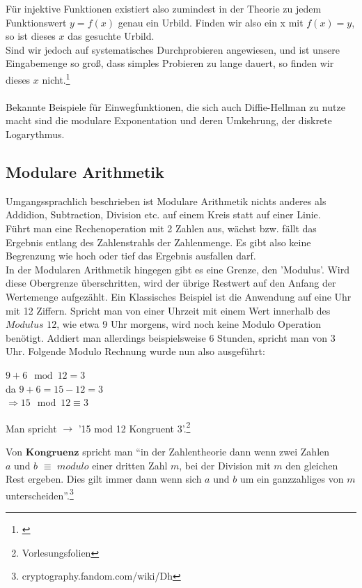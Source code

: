 \documentclass[a4paper,12pt]{scrartcl}
\begin{document}
Für injektive Funktionen existiert also zumindest in der Theorie zu jedem
Funktionswert $y = f(x)$ genau ein Urbild. Finden wir also ein x mit $f(x) = y$, so ist
dieses $x$ das gesuchte Urbild.\\
Sind wir jedoch auf systematisches Durchprobieren angewiesen, und ist
unsere Eingabemenge so groß, dass simples Probieren zu lange dauert, so
finden wir dieses $x$ nicht.\footnote{\cite{10.1007/BFb0054851}}\\
\\
Bekannte Beispiele für Einwegfunktionen, die sich auch Diffie-Hellman zu nutze macht sind die modulare Exponentation und deren Umkehrung, der diskrete Logarythmus.
\newpage
\subsection{Modulare Arithmetik}
Umgangssprachlich beschrieben ist Modulare Arithmetik nichts anderes als Addidion, Subtraction, Division etc. auf einem Kreis statt auf einer Linie. \\
Führt man eine Rechenoperation mit 2 Zahlen aus, wächst bzw. fällt das Ergebnis entlang des Zahlenstrahls der Zahlenmenge. 
Es gibt also keine Begrenzung wie hoch oder tief das Ergebnis ausfallen darf.\\
In der Modularen Arithmetik hingegen gibt es eine Grenze, den 'Modulus'. Wird diese Obergrenze überschritten, wird der übrige Restwert auf den Anfang der Wertemenge aufgezählt. Ein Klassisches Beispiel ist die Anwendung auf eine Uhr mit 12 Ziffern. Spricht man von einer Uhrzeit mit einem Wert innerhalb des $Modulus$ $12$, wie etwa 9 Uhr morgens, wird noch keine Modulo Operation benötigt. Addiert man allerdings beispielsweise 6 Stunden, spricht man von 3 Uhr. Folgende Modulo Rechnung wurde nun also ausgeführt:
\begin{center}
  $9 + 6 \mod 12 = 3$ \\
   da $9 + 6 = 15         
         -         12 = 3$\\
   $\Rightarrow 15 \mod 12 \equiv 3$\\

\end{center}
  Man spricht $\rightarrow$ '15 mod 12 Kongruent 3'.\footnote{Vorlesungsfolien}\newline

  Von $\textbf {Kongruenz}$ spricht man ``in der Zahlentheorie dann wenn zwei Zahlen\\ $a$ und $b$ $\equiv$ $modulo$ einer dritten Zahl $m$, bei der Division mit $m$ den gleichen Rest ergeben. Dies gilt immer dann wenn sich $a$ und $b$ um ein ganzzahliges von $m$ unterscheiden''.\footnote{cryptography.fandom.com/wiki/Dh}
\end{document}
